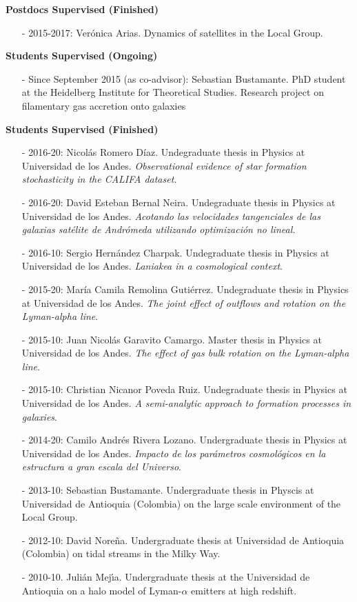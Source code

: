 \documentclass[letterpaper,11pt,onecolumn]{article}
\begin{document}
{\bf Postdocs Supervised (Finished)}
\begin{itemize}
\item[-] 2015-2017: Ver\'onica Arias. Dynamics of satellites in the
  Local Group.  
\end{itemize}

{\bf Students Supervised (Ongoing)}

\begin{itemize}
\item[-] Since September 2015 (as co-advisor): Sebastian
  Bustamante. PhD student at the Heidelberg Institute for Theoretical
  Studies. Research project on filamentary gas accretion onto galaxies
\end{itemize}

{\bf Students Supervised (Finished)}
\begin{itemize}
\item[-]
  2016-20:
  Nicol\'as Romero D\'iaz.
  Undegraduate thesis in Physics at Universidad de los Andes. 
  \emph{Observational evidence of star formation stochasticity in the
    CALIFA dataset.}
\item[-] 
  2016-20: 
  David Esteban  Bernal Neira.
  Undegraduate thesis in Physics at Universidad de los Andes. 
  \emph{Acotando las velocidades tangenciales de las galaxias
    sat\'elite de Andr\'omeda utilizando optimizaci\'on no lineal.} 
\item[-] 2016-10: Sergio Hern\'andez Charpak. Undegraduate
  thesis in Physics at Universidad de los Andes. \emph{Laniakea in a cosmological context}. 
\item[-] 2015-20: Mar\'ia Camila Remolina Guti\'errez. Undegraduate
  thesis in Physics at Universidad de los Andes. \emph{The joint
    effect of outflows and rotation on the Lyman-alpha line}. 
\item[-] 2015-10: Juan Nicol\'as Garavito Camargo. Master
  thesis in Physics at Universidad de los Andes. \emph{The effect of
    gas bulk rotation on the Lyman-alpha line}.
\item[-] 2015-10: Christian Nicanor Poveda Ruiz. Undegraduate thesis
  in Physics at Universidad de los Andes. \emph{A semi-analytic
    approach to formation processes in galaxies}. 
\item[-] 2014-20: Camilo Andr\'es Rivera Lozano. Undergraduate thesis
  in Physics at Universidad de los Andes. \emph{Impacto de los
    par\'ametros cosmol\'ogicos en la 
    estructura a gran escala del Universo}.
\item[-] 2013-10: Sebastian Bustamante. Undergraduate thesis in
  Physcis at Universidad de Antioquia (Colombia) on the large scale environment
  of the Local Group.  
\item[-] 2012-10: David Nore\~na. Undergraduate thesis at Universidad
  de Antioquia (Colombia) on tidal streams in the Milky Way. 
\item[-] 2010-10. Juli\'an Mej\'{\i}a. Undergraduate thesis at the
  Universidad de Antioquia on a halo model of
  Lyman-$\alpha$ emitters at high redshift. 
\end{itemize}
\end{document}
